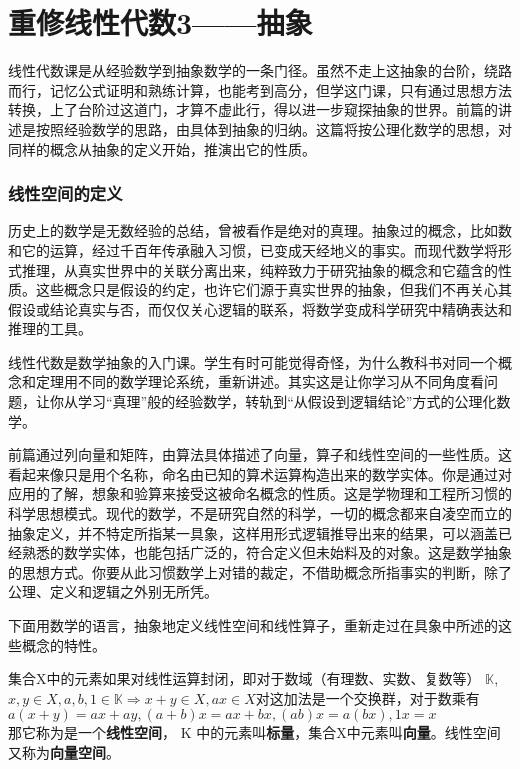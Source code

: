 
\chapter{重修线性代数3——抽象 }
线性代数课是从经验数学到抽象数学的一条门径。虽然不走上这抽象的台阶，绕路而行，记忆公式证明和熟练计算，也能考到高分，但学这门课，只有通过思想方法转换，上了台阶过这道门，才算不虚此行，得以进一步窥探抽象的世界。前篇的讲述是按照经验数学的思路，由具体到抽象的归纳。这篇将按公理化数学的思想，对同样的概念从抽象的定义开始，推演出它的性质。

\subsection{线性空间的定义} 

历史上的数学是无数经验的总结，曾被看作是绝对的真理。抽象过的概念，比如数和它的运算，经过千百年传承融入习惯，已变成天经地义的事实。而现代数学将形式推理，从真实世界中的关联分离出来，纯粹致力于研究抽象的概念和它蕴含的性质。这些概念只是假设的约定，也许它们源于真实世界的抽象，但我们不再关心其假设或结论真实与否，而仅仅关心逻辑的联系，将数学变成科学研究中精确表达和推理的工具。

线性代数是数学抽象的入门课。学生有时可能觉得奇怪，为什么教科书对同一个概念和定理用不同的数学理论系统，重新讲述。其实这是让你学习从不同角度看问题，让你从学习“真理”般的经验数学，转轨到“从假设到逻辑结论”方式的公理化数学。

前篇通过列向量和矩阵，由算法具体描述了向量，算子和线性空间的一些性质。这看起来像只是用个名称，命名由已知的算术运算构造出来的数学实体。你是通过对应用的了解，想象和验算来接受这被命名概念的性质。这是学物理和工程所习惯的科学思想模式。现代的数学，不是研究自然的科学，一切的概念都来自凌空而立的抽象定义，并不特定所指某一具象，这样用形式逻辑推导出来的结果，可以涵盖已经熟悉的数学实体，也能包括广泛的，符合定义但未始料及的对象。这是数学抽象的思想方式。你要从此习惯数学上对错的裁定，不借助概念所指事实的判断，除了公理、定义和逻辑之外别无所凭。

下面用数学的语言，抽象地定义线性空间和线性算子，重新走过在具象中所述的这些概念的特性。

\kaishu
集合X中的元素如果对线性运算封闭，即对于数域（有理数、实数、复数等） $\mathbb{K}$,$ x, y \in X, a, b, 1 \in \mathbb{K} \Rightarrow  x+y \in X, ax \in X $对这加法是一个交换群，对于数乘有$ a(x+y)=ax+ay, (a+b)x=ax+bx, (ab)x=a(bx),1x=x $\\
那它称为是一个\textbf{线性空间}， K 中的元素叫\textbf{标量}，集合X中元素叫\textbf{向量}。线性空间又称为\textbf{向量空间}。

